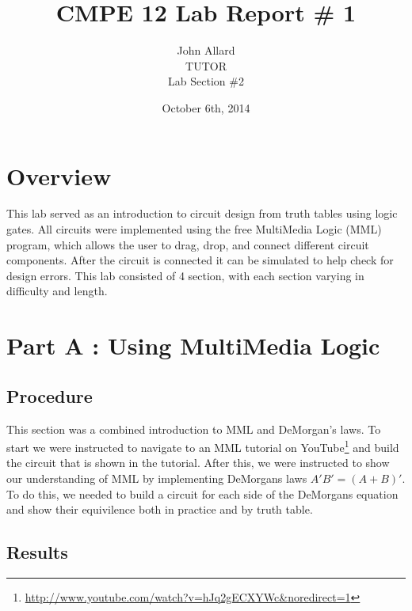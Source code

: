 \documentclass[a4paper,11pt]{article}
\title{ CMPE 12 Lab Report \# 1 \\[7 in]}
\author{John Allard \\ TUTOR \\ Lab Section \#2}
\date{October 6th, 2014}
\begin{document}
\maketitle
\newpage
\tableofcontents
\newpage


\section{Overview}
This lab served as an introduction to circuit design from truth tables using logic gates. All circuits were implemented using the free MultiMedia Logic (MML) program, which allows the user to drag, drop, and connect different circuit components. After the circuit is connected it can be simulated to help check for design errors. This lab consisted of 4 section, with each section varying in difficulty and length. 




\section{Part A : Using MultiMedia Logic}
\subsection{Procedure}
This section was a combined introduction to MML and DeMorgan's laws. To start we were instructed to navigate to an MML tutorial on YouTube\footnote{\url{http://www.youtube.com/watch?v=hJq2gECXYWc&noredirect=1}} and build the circuit that is shown in the tutorial. After this, we were instructed to show our understanding of MML by implementing DeMorgans laws \(A'B' = (A+B)'\). To do this, we needed to build a circuit for each side of the DeMorgans equation and show their equivilence both in practice and by truth table. 
\subsection{Results}
\end{document}
